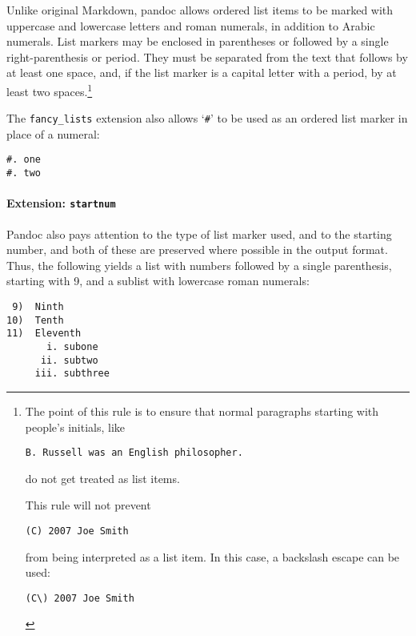 \documentclass[
]{article}
\begin{document}
Unlike original Markdown, pandoc allows ordered list items to be marked
with uppercase and lowercase letters and roman numerals, in addition to
Arabic numerals. List markers may be enclosed in parentheses or followed
by a single right-parenthesis or period. They must be separated from the
text that follows by at least one space, and, if the list marker is a
capital letter with a period, by at least two spaces.\footnote{The point
  of this rule is to ensure that normal paragraphs starting with
  people's initials, like

\begin{Verbatim}
B. Russell was an English philosopher.
\end{Verbatim}

  do not get treated as list items.

  This rule will not prevent

\begin{Verbatim}
(C) 2007 Joe Smith
\end{Verbatim}

  from being interpreted as a list item. In this case, a backslash
  escape can be used:

\begin{Verbatim}
(C\) 2007 Joe Smith
\end{Verbatim}
}

The \texttt{fancy\_lists} extension also allows `\texttt{\#}' to be used
as an ordered list marker in place of a numeral:

\begin{verbatim}
#. one
#. two
\end{verbatim}

\hypertarget{extension-startnum}{%
\paragraph{\texorpdfstring{Extension:
\texttt{startnum}}{Extension: startnum}}\label{extension-startnum}}

Pandoc also pays attention to the type of list marker used, and to the
starting number, and both of these are preserved where possible in the
output format. Thus, the following yields a list with numbers followed
by a single parenthesis, starting with 9, and a sublist with lowercase
roman numerals:

\begin{verbatim}
 9)  Ninth
10)  Tenth
11)  Eleventh
       i. subone
      ii. subtwo
     iii. subthree
\end{verbatim}
\end{document}
